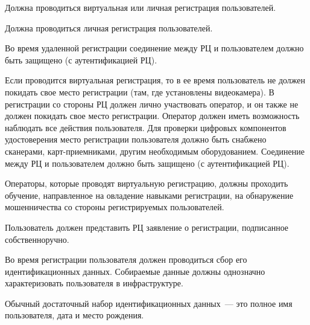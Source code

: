 


Должна проводиться виртуальная или личная регистрация пользователей.

Должна проводиться личная регистрация пользователей.

Во время удаленной регистрации соединение между РЦ и пользователем должно быть 
защищено (с аутентификацией РЦ).

Если проводится виртуальная регистрация, то в ее время пользователь не должен
покидать свое место регистрации (там, где установлены видеокамера). В
регистрации со стороны РЦ должен лично участвовать оператор, и он также не
должен покидать свое место регистрации.
%
Оператор должен иметь возможность наблюдать все действия пользователя.
%
Для проверки цифровых компонентов удостоверения место регистрации пользователя
должно быть снабжено сканерами, карт-приемниками, другим необходимым
оборудованием.
%
Соединение между РЦ и пользователем должно быть защищено (с аутентификацией РЦ).


Операторы, которые проводят виртуальную регистрацию, должны проходить обучение, 
направленное на овладение навыками регистрации, на обнаружение мошенничества со 
стороны регистрируемых пользователей.
%

Пользователь должен представить РЦ заявление о регистрации, подписанное 
собственноручно.


Во время регистрации пользователя должен проводиться сбор его идентификационных
данных. Собираемые данные должны однозначно характеризовать пользователя
в инфраструктуре.

\begin{note}
Обычный достаточный набор идентификационных данных~--- это 
полное имя пользователя, дата и место рождения.
\end{note}


